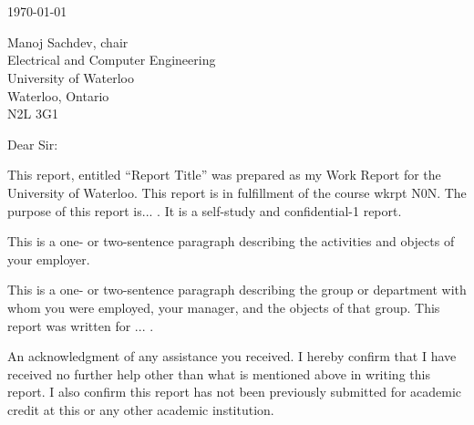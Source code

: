 \documentclass{ece}
\begin{document}

\maketitle



\printauthorstreetaddress\\
\printauthorlocation\\
\printauthorpostalcode

\today

Manoj Sachdev, chair\\
Electrical and Computer Engineering\\
University of Waterloo\\
Waterloo, Ontario\\
N2L 3G1

Dear Sir:

This report, entitled ``Report Title'' was prepared as my \printterm Work Report for the University of Waterloo. This report is in fulfillment of the course \gls{wkrpt} N0N. The purpose of this report is... .  It is a self-study and confidential-1 report.

This is a one- or two-sentence paragraph describing the activities and objects of your employer.

This is a one- or two-sentence paragraph describing the group or department with whom you were employed, your manager, and the objects of that group.  This report was written for ... .

An acknowledgment of any assistance you received.  I hereby confirm that I have received no further help other than what is mentioned above in writing this report. I also confirm this report has not been previously submitted for academic credit at this or any other academic institution.
\end{document}
